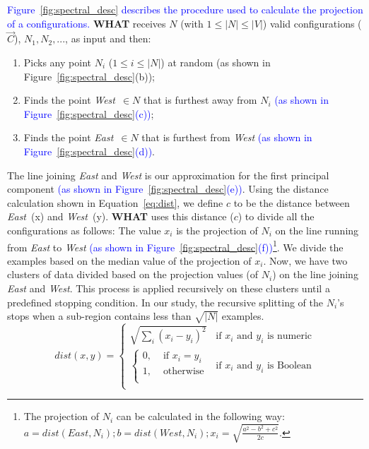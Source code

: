 \documentclass[smallextended]{svjour3}       %
\newcommand{\what}{{\bf WHAT}\xspace}
\begin{document}
\textcolor{blue}{Figure~\ref{fig:spectral_desc} describes the procedure used to calculate the projection of a configurations.} \what receives $N$ (with $1\leq \left\vert{N}\right\vert\leq \left\vert{V}\right\vert$)
valid configurations ($\vec{C}$), $N_1,N_2,...$, as input and then:
\begin{enumerate}
\item
Picks any
point $N_i$ ($1\leq i \leq\left\vert{N}\right\vert$) at random (as shown in Figure~\ref{fig:spectral_desc}(b));
\item
Finds
 the point  {\em West}~$\in N$ that is
furthest away from $N_i$ \textcolor{blue}{(as shown in Figure~\ref{fig:spectral_desc}(c))};
\item Finds the point {\em East}~$\in N$
that is furthest from {\em West} \textcolor{blue}{(as shown in Figure~\ref{fig:spectral_desc}(d))}.
\end{enumerate}
The line joining {\em East}
and {\em West} is our approximation for the first principal component \textcolor{blue}{(as shown in Figure~\ref{fig:spectral_desc}(e))}.
Using the distance calculation shown in Equation~\ref{eq:dist}, 
we define $\mathit{c}$ to be the distance between {\em East}~(x)
and {\em West}~(y). 
\what uses this distance ($\mathit{c}$) to divide all the configurations as follows:
The value $x_i$ is the projection of $N_i$
on the line  running  from {\em East} to {\em West} \textcolor{blue}{(as shown in Figure~\ref{fig:spectral_desc}(f))}\footnote{The projection of $N_i$ can be calculated in the following way:\newline $a = \mathit{dist}(\mathit{East}, N_i); b = \mathit{dist}(\mathit{West}, N_i);  x_i = \sqrt{\frac{a^2 - b^2 + \mathit{c}^2}{2\mathit{c}}}$.
}.  We divide
the examples based on the median value of the projection of $x_i$. Now, we have two clusters of data divided based on the projection values (of $N_i$) on the line joining {\em East} and {\em West}. This process is applied recursively on these clusters until a predefined stopping condition. In our study, the  recursive splitting of the $N_i$'s stops when a sub-region
contains less than  $\sqrt{|N|}$ examples.
\begin{equation}
    \mathit{dist}(x, y) =     
    \begin{cases}
      \sqrt{\sum_i(x_i-y_i)^2}
      & \text{if $x_i$ and $y_i$ is numeric}\\
        \begin{cases}
            0, & \text{ if $x_i = y_i$}\\
            1, & \text{ otherwise}\\
        \end{cases}
        & \text{if $x_i$ and $y_i$ is Boolean}\\
    \end{cases}
    \label{eq:dist}
\end{equation}
\end{document}
